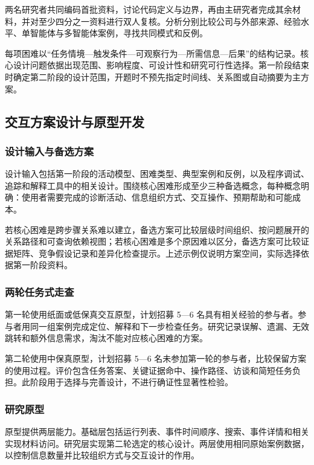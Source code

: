 两名研究者共同编码首批资料，讨论代码定义与边界，再由主研究者完成其余材料，并对至少四分之一资料进行双人复核。分析分别比较公司与外部来源、经验水平、单智能体与多智能体案例，寻找共同模式和反例。

每项困难以“任务情境—触发条件—可观察行为—所需信息—后果”的结构记录。核心设计问题依据出现范围、影响程度、可设计性和研究可行性选择。第一阶段结束时确定第二阶段的设计范围，开题时不预先指定时间线、关系图或自动摘要为主方案。

\subsection{交互方案设计与原型开发}

\subsubsection{设计输入与备选方案}

设计输入包括第一阶段的活动模型、困难类型、典型案例和反例，以及程序调试、追踪和解释工具中的相关设计。围绕核心困难形成至少三种备选概念，每种概念明确：使用者需要完成的诊断活动、信息组织方式、交互操作、预期帮助和可能成本。

若核心困难是跨步骤关系难以建立，备选方案可比较层级时间组织、按问题展开的关系路径和可查询依赖视图；若核心困难是多个原因难以区分，备选方案可比较证据矩阵、竞争假设记录和差异化检查提示。上述示例仅说明方案空间，实际选择依据第一阶段资料。

\subsubsection{两轮任务式走查}

第一轮使用纸面或低保真交互原型，计划招募 5—6 名具有相关经验的参与者。参与者用同一组案例完成定位、解释和下一步检查任务。研究记录误解、遗漏、无效跳转和额外信息需求，淘汰不能对应核心困难的方案。

第二轮使用中保真原型，计划招募 5—6 名未参加第一轮的参与者，比较保留方案的使用过程。评价包含任务答案、关键证据命中、操作路径、访谈和简短任务负担。此阶段用于选择与完善设计，不进行确证性显著性检验。

\subsubsection{研究原型}

原型提供两层能力。基础层包括运行列表、事件时间顺序、搜索、事件详情和相关实现材料访问。研究层实现第二轮选定的核心设计。两层使用相同原始案例数据，以控制信息数量并比较组织方式与交互设计的作用。

